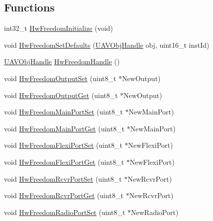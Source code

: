 \subsection*{\-Functions}
\begin{DoxyCompactItemize}
\item 
int32\-\_\-t \hyperlink{group___hw_freedom_gadb0e84cd94487d72b6fa51321e3e7595}{\-Hw\-Freedom\-Initialize} (void)
\item 
void \hyperlink{group___hw_freedom_ga565103d56c4d94e7e2f26b79c4a58546}{\-Hw\-Freedom\-Set\-Defaults} (\hyperlink{targets_2_u_a_v_objects_2inc_2uavobjectmanager_8h_a279053e22be53ce9f895043aaeb91e3b}{\-U\-A\-V\-Obj\-Handle} obj, uint16\-\_\-t inst\-Id)
\item 
\hyperlink{targets_2_u_a_v_objects_2inc_2uavobjectmanager_8h_a279053e22be53ce9f895043aaeb91e3b}{\-U\-A\-V\-Obj\-Handle} \hyperlink{group___hw_freedom_gad661c117595f912578a6cba8671b81b9}{\-Hw\-Freedom\-Handle} ()
\item 
void \hyperlink{group___hw_freedom_ga822e7304421799fc45485b42523c4bf4}{\-Hw\-Freedom\-Output\-Set} (uint8\-\_\-t $\ast$\-New\-Output)
\item 
void \hyperlink{group___hw_freedom_ga1cf2d5c6f36957bd6c7d1685e48ae9d4}{\-Hw\-Freedom\-Output\-Get} (uint8\-\_\-t $\ast$\-New\-Output)
\item 
void \hyperlink{group___hw_freedom_gaa679eb943c458a9261cbab930a48061d}{\-Hw\-Freedom\-Main\-Port\-Set} (uint8\-\_\-t $\ast$\-New\-Main\-Port)
\item 
void \hyperlink{group___hw_freedom_gabde716de6b39b0135a7cdc4fb3de3352}{\-Hw\-Freedom\-Main\-Port\-Get} (uint8\-\_\-t $\ast$\-New\-Main\-Port)
\item 
void \hyperlink{group___hw_freedom_ga33b61f130f53c6c88b2bc73e0f1680a9}{\-Hw\-Freedom\-Flexi\-Port\-Set} (uint8\-\_\-t $\ast$\-New\-Flexi\-Port)
\item 
void \hyperlink{group___hw_freedom_gaa13646b7de926afc13bab2c73a59bc5d}{\-Hw\-Freedom\-Flexi\-Port\-Get} (uint8\-\_\-t $\ast$\-New\-Flexi\-Port)
\item 
void \hyperlink{group___hw_freedom_ga33e7b3a7b202176c55717fe631ca906c}{\-Hw\-Freedom\-Rcvr\-Port\-Set} (uint8\-\_\-t $\ast$\-New\-Rcvr\-Port)
\item 
void \hyperlink{group___hw_freedom_ga7d468098a1a0766c79ba1974c2a75f17}{\-Hw\-Freedom\-Rcvr\-Port\-Get} (uint8\-\_\-t $\ast$\-New\-Rcvr\-Port)
\item 
void \hyperlink{group___hw_freedom_ga5a6c9c02cd9d9435218f5f8aa81660a3}{\-Hw\-Freedom\-Radio\-Port\-Set} (uint8\-\_\-t $\ast$\-New\-Radio\-Port)

\end{DoxyCompactItemize}
